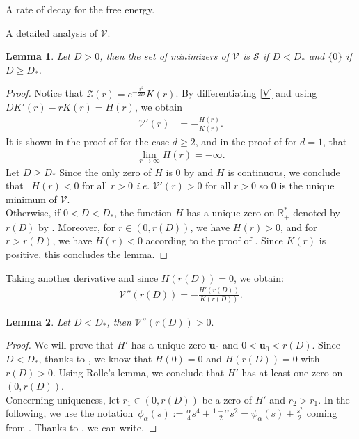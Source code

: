\documentclass[reqno]{amsart} %
\newtheorem{lemma}{Lemma}[section]
\begin{document}
\begin{section}{A rate of decay for the free energy.}
\begin{subsection}{A detailed analysis of  \texorpdfstring{$\mathcal{V}$}{V}.}
\begin{lemma}
\label{lemmappendic1}
    Let $D>0$, then the set of minimizers of $\mathcal{V}$ is $\mathcal{S}$ if $D<D_*$ and $\{0\} $ if $D\geq D_*$.
\end{lemma}
\begin{proof}
Notice that
$\mathcal{Z}(r)= e^{-\frac{r^2}{2D}} K(r)$. 
By differentiating  \eqref{V} and using  $DK'(r)-rK(r)=H(r)$, we obtain
\begin{align*}
    \mathcal{V}'(r)
    &= - \frac{H(r)}{ K(r)}.
\end{align*}
 It is shown in the proof of \cite[Proposition~2.3]{Li2021}
  for the case $d \geq  2$, and in the proof of \cite[Proposition~2.2]{Li2021} for $d = 1$, that
\begin{align*}
    \lim_{r \rightarrow \infty} H(r) = -\infty.
\end{align*}
Let $D\geq D_*$
Since the only zero of $H$ is $0$ by  and $H$ is continuous, we conclude that~ $H(r)<0$ for all $r>0$ \emph{i.e.} $\mathcal{V}'(r) > 0$ for all $r > 0$ so $0$ is the unique minimum of $\mathcal{V}$.
\\
Otherwise, if $0<D<D_*$, the function $H$ has a unique zero on $\mathbb{R}_+^*$  denoted by $r(D)$ by . Moreover, for $r \in (0,r(D))$, we have $H(r)>0$, and for $r>r(D)$, we have $H(r)<0$ according to the proof of \cite[Proposition~2.2, Proposition~2.3]{Li2021}. Since $K(r)$ is positive, this concludes the lemma. 
\end{proof}
Taking another derivative and since $H(r(D))=0$,
 we obtain:
 \begin{align}
 \label{lasteq}
     {\mathcal{V}}''(r(D))=- \frac{H'(r(D))}{K(r(D))}.
 \end{align}



\begin{lemma}
\label{Hprime}
    Let  $D<D_*$, then $\mathcal{V}''(r(D))>0.$
\end{lemma}


\begin{proof}We will prove that $H'$ has a unique zero $\mathbf{u}_0$ and $0<\mathbf{u}_0<r(D)$.
    Since $D<D_{*}$, thanks to , we know that $H(0)=0$ and   $H(r(D))=0$ with $r(D)>0$. Using Rolle's lemma, we conclude that $H'$ has at least one zero on $(0,r(D))$.
    \\
Concerning uniqueness,
let $r_1 \in (0,r(D))$ be a zero of $H'$ and $r_2>r_1.$ 
In the following, we use the notation~\mbox{$\phi_{\alpha}(s):=\frac{\alpha}{4}s^4+\frac{1-\alpha}{2}s^2=\psi_{\alpha}(s)+\frac{s^2}{2}$} coming from \cite{Li2021}.
Thanks to \cite[Lemma~2.1 and \mbox{Section 2.3}]{Li2021},   we can write,


\end{proof}
\end{subsection}
\end{section}
\end{document}
